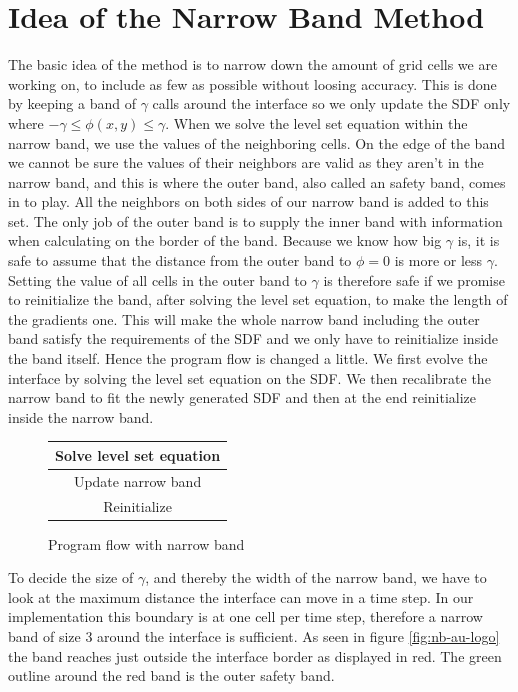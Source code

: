 \section{Idea of the Narrow Band Method}
The basic idea of the method is to narrow down the amount of grid
cells we are working on, to include as few as possible without loosing
accuracy. This is done by keeping a band of $\gamma$ calls around the
interface so we only update the SDF only where
$-\gamma \leq \phi(x,y) \leq \gamma$. When we solve the level set
equation within the narrow band, we use the values of the neighboring
cells. On the edge of the band we cannot be sure the values of their
neighbors are valid as they aren't in the narrow band, and this is
where the outer band, also called an safety band, comes in to
play. All the neighbors on both sides of our narrow band is added to
this set. The only job of the outer band is to supply the inner band
with information when calculating on the border of the band. Because
we know how big $\gamma$ is, it is safe to assume that the distance
from the outer band to $\phi=0$ is more or less $\gamma$. Setting the
value of all cells in the outer band to $\gamma$ is therefore safe if
we promise to reinitialize the band, after solving the level set
equation, to make the length of the gradients one.  This will make the
whole narrow band including the outer band satisfy the requirements of
the SDF and we only have to reinitialize inside the band itself. Hence
the program flow is changed a little. We first evolve the interface by
solving the level set equation on the SDF. We then recalibrate the
narrow band to fit the newly generated SDF and then at the end
reinitialize inside the narrow band.


\begin{figure}[!ht]
  \centering
  \begin{tabular}{ | c | }
   \hline			
   Solve level set equation \\
   \hline
   Update narrow band \\
   \hline   
   Reinitialize \\
   \hline  
  \end{tabular}
  \caption{Program flow with narrow band}
  \label{fig:narrowband_flow}
\end{figure}


To decide the size of $\gamma$, and thereby the width of the narrow
band, we have to look at the maximum distance the interface can move
in a time step. In our implementation this boundary is at one cell
per time step, therefore a narrow band of size 3 around the interface
is sufficient. As seen in figure \vref{fig:nb-au-logo} the band
reaches just outside the interface border as displayed in red. The
green outline around the red band is the outer safety band.

